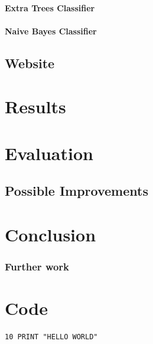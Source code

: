 \documentclass[a4paper,11pt]{report}
\begin{document}
\subsubsection{Extra Trees Classifier}
\subsubsection{Naive Bayes Classifier}

\section{Website}
\chapter{Results}
\label{chap:results}

\chapter{Evaluation}
\label{chap:evaluation}
\section{Possible Improvements}

\chapter{Conclusion}
\label{chap:conclusion}

\subsection{Further work}



\clearpage
{}
{}



\appendix


\chapter{Code}
\label{app:code}

\begin{verbatim}
10 PRINT "HELLO WORLD"
\end{verbatim}


\end{document}

